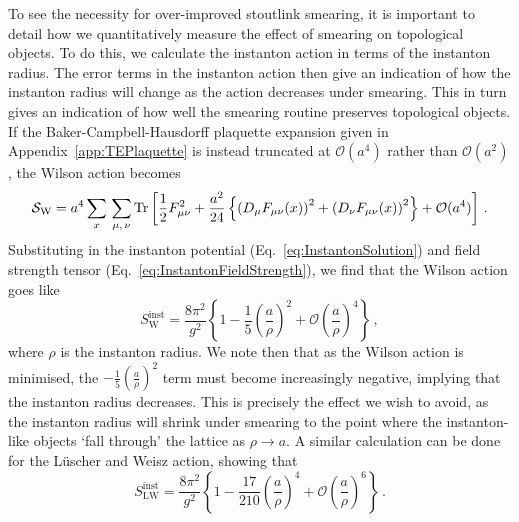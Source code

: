 To see the necessity for over-improved stoutlink smearing, it is important to detail how we quantitatively measure the effect of smearing on topological objects. To do this, we calculate the instanton action in terms of the instanton radius. The error terms in the instanton action then give an indication of how the instanton radius will change as the action decreases under smearing. This in turn gives an indication of how well the smearing routine preserves topological objects. If the Baker-Campbell-Hausdorff plaquette expansion given in Appendix~\ref{app:TEPlaquette} is instead truncated at $\mathcal{O}(a^4)$ rather than $\mathcal{O}(a^2)$, the Wilson action becomes~\cite{GarciaPerez:1993lic}
%
\begin{equation}
\mathcal{S}_\text{W} = a^4\sum_x\,\sum_{\mu,\,\nu} \operatorname{Tr}\left[\frac{1}{2}F_{\mu\nu}^2 + \frac{a^2}{24}\left\lbrace \left( D _ { \mu } F _ { \mu \nu } ( x ) \right) ^ { 2 } + \left( D _ { \nu } F _ { \mu \nu } ( x ) \right) ^ { 2 } \right\rbrace + \mathcal{O}(a^4)\right]\, .
\end{equation}
%
Substituting in the instanton potential (Eq.~\ref{eq:InstantonSolution}) and field strength tensor (Eq.~\ref{eq:InstantonFieldStrength}), we find that the Wilson action goes like
%
\begin{equation}
S_\text{W}^\text{inst} = \frac{8\pi^2}{g^2}\left\{1-\frac{1}{5}\left(\frac{a}{\rho}\right)^2 + \mathcal{O}\left(\frac{a}{\rho}\right)^4 \right\}\, ,
\end{equation}
%
where $\rho$ is the instanton radius. We note then that as the Wilson action is minimised, the $-\frac{1}{5}\left(\frac{a}{\rho}\right)^2$ term must become increasingly negative, implying that the instanton radius decreases. This is precisely the effect we wish to avoid, as the instanton radius will shrink under smearing to the point where the instanton-like objects `fall through' the lattice as $\rho\rightarrow a$. A similar calculation can be done for the L\"uscher and Weisz action, showing that~\cite{GarciaPerez:1993lic}\\
%
\begin{equation}
S_\text{LW}^\text{inst} = \frac{8\pi^2}{g^2}\left\{ 1 - \frac { 17 } { 210 } \left(  \frac{a}{\rho} \right) ^ { 4 } + \mathcal { O } \left( \frac{a}{\rho} \right) ^ { 6 } \right\}\, .
\end{equation}
%

